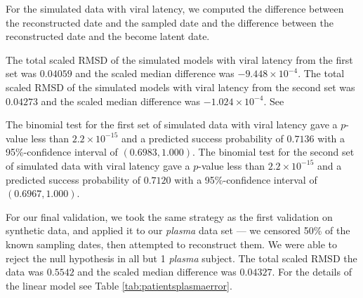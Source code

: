 \documentclass[12pt]{article}
\begin{document}
For the simulated data with viral latency, we computed the difference between the reconstructed date and the sampled date and the difference between the reconstructed date and the become latent date.

The total scaled RMSD of the simulated models with viral latency from the first set was $0.04059$ and the scaled median difference was $-9.448 \times{} 10^{-4}$. The total scaled RMSD of the simulated models with viral latency from the second set was $0.04273$ and the scaled median difference was $-1.024 \times{} 10^{-4}$. See 

The {binomial test} for the first set of simulated data with viral latency gave a $p$-value less than $2.2\times 10^{-15}$ and a predicted success probability of $0.7136$ with a 95\%-confidence interval of $(0.6983, 1.000)$.
The {binomial test} for the second set of simulated data with viral latency gave a $p$-value less than $2.2\times 10^{-15}$ and a predicted success probability of $0.7120$ with a 95\%-confidence interval of $(0.6967, 1.000)$.


For our final validation, we took the same strategy as the first validation on synthetic data, and applied it to our {\em plasma} data set --- we censored 50\% of the known sampling dates, then attempted to reconstruct them.
We were able to reject the null hypothesis in all but 1 {\em plasma} subject.
The total scaled RMSD the data was $0.5542$ and the scaled median difference was $0.04327$.
For the details of the linear model see Table \ref{tab:patientsplasmaerror}.
\end{document}
